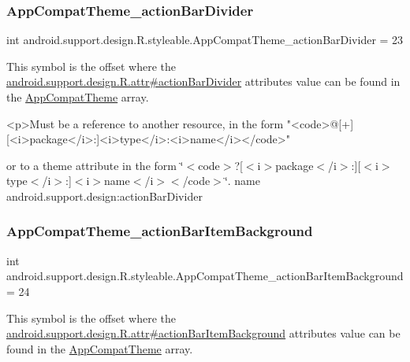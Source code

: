 \subsubsection{\texorpdfstring{App\+Compat\+Theme\+\_\+action\+Bar\+Divider}{AppCompatTheme\_actionBarDivider}}
{\footnotesize\ttfamily int android.\+support.\+design.\+R.\+styleable.\+App\+Compat\+Theme\+\_\+action\+Bar\+Divider = 23\hspace{0.3cm}{\ttfamily [static]}}

This symbol is the offset where the \hyperlink{classandroid_1_1support_1_1design_1_1R_1_1attr_a414b92e66e21228ba492f0816373c4fe}{android.\+support.\+design.\+R.\+attr\#action\+Bar\+Divider} attribute\textquotesingle{}s value can be found in the \hyperlink{classandroid_1_1support_1_1design_1_1R_1_1styleable_afb351dc8de20cbd4c89abe360373010c}{App\+Compat\+Theme} array.

\begin{DoxyVerb}      <p>Must be a reference to another resource, in the form "<code>@[+][<i>package</i>:]<i>type</i>:<i>name</i></code>"
\end{DoxyVerb}
 or to a theme attribute in the form \char`\"{}$<$code$>$?\mbox{[}$<$i$>$package$<$/i$>$\+:\mbox{]}\mbox{[}$<$i$>$type$<$/i$>$\+:\mbox{]}$<$i$>$name$<$/i$>$$<$/code$>$\char`\"{}.  name android.\+support.\+design\+:action\+Bar\+Divider \mbox{\label{classandroid_1_1support_1_1design_1_1R_1_1styleable_af6c020b0e1ecf70811c2d81f3d06d55b}} 
\subsubsection{\texorpdfstring{App\+Compat\+Theme\+\_\+action\+Bar\+Item\+Background}{AppCompatTheme\_actionBarItemBackground}}
{\footnotesize\ttfamily int android.\+support.\+design.\+R.\+styleable.\+App\+Compat\+Theme\+\_\+action\+Bar\+Item\+Background = 24\hspace{0.3cm}{\ttfamily [static]}}

This symbol is the offset where the \hyperlink{classandroid_1_1support_1_1design_1_1R_1_1attr_a39a183fd8748721aaa4fa22a492f13da}{android.\+support.\+design.\+R.\+attr\#action\+Bar\+Item\+Background} attribute\textquotesingle{}s value can be found in the \hyperlink{classandroid_1_1support_1_1design_1_1R_1_1styleable_afb351dc8de20cbd4c89abe360373010c}{App\+Compat\+Theme} array.

